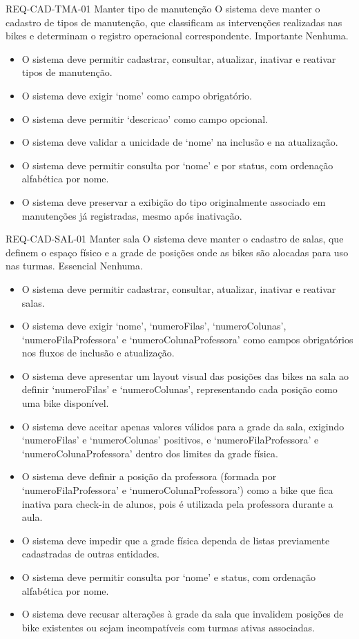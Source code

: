 
\reqfunccad
{REQ-CAD-TMA-01 Manter tipo de manutenção}
{O sistema deve manter o cadastro de tipos de manutenção, que classificam as intervenções realizadas nas bikes e determinam o registro operacional correspondente.}
{Importante}
{Nenhuma.}
{\begin{itemize}[leftmargin=0.6cm]
    \item O sistema deve permitir cadastrar, consultar, atualizar, inativar e reativar tipos de manutenção.
    \item O sistema deve exigir `nome' como campo obrigatório.
    \item O sistema deve permitir `descricao' como campo opcional.
    \item O sistema deve validar a unicidade de `nome' na inclusão e na atualização.
    \item O sistema deve permitir consulta por `nome' e por status, com ordenação alfabética por nome.
    \item O sistema deve preservar a exibição do tipo originalmente associado em manutenções já registradas, mesmo após inativação.
\end{itemize}}


\reqfunccad
{REQ-CAD-SAL-01 Manter sala}
{O sistema deve manter o cadastro de salas, que definem o espaço físico e a grade de posições onde as bikes são alocadas para uso nas turmas.}
{Essencial}
{Nenhuma.}
{\begin{itemize}[leftmargin=0.6cm]
    \item O sistema deve permitir cadastrar, consultar, atualizar, inativar e reativar salas.
    \item O sistema deve exigir `nome', `numeroFilas', `numeroColunas', `numeroFilaProfessora' e `numeroColunaProfessora' como campos obrigatórios nos fluxos de inclusão e atualização.
    \item O sistema deve apresentar um layout visual das posições das bikes na sala ao definir `numeroFilas' e `numeroColunas', representando cada posição como uma bike disponível.
    \item O sistema deve aceitar apenas valores válidos para a grade da sala, exigindo `numeroFilas' e `numeroColunas' positivos, e `numeroFilaProfessora' e `numeroColunaProfessora' dentro dos limites da grade física.
    \item O sistema deve definir a posição da professora (formada por `numeroFilaProfessora' e `numeroColunaProfessora') como a bike que fica inativa para check-in de alunos, pois é utilizada pela professora durante a aula.
    \item O sistema deve impedir que a grade física dependa de listas previamente cadastradas de outras entidades.
    \item O sistema deve permitir consulta por `nome' e status, com ordenação alfabética por nome.
    \item O sistema deve recusar alterações à grade da sala que invalidem posições de bike existentes ou sejam incompatíveis com turmas ativas associadas.
\end{itemize}}

